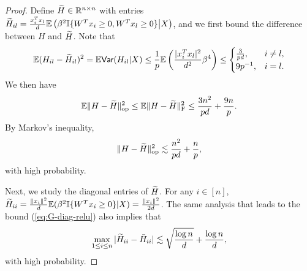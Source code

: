 \begin{proof}
Define $\widetilde{H}\in\mathbb{R}^{n\times n}$ with entries $\widetilde{H}_{il}=\frac{x_i^Tx_l}{d}\mathbb{E}\left(\beta^2\mathbb{I}\{W^Tx_i\geq 0, W^Tx_l\geq 0\}\big|X\right)$, and we first bound the difference between $H$ and $\widetilde{H}$. Note that
$$\mathbb{E}(H_{il}-\wt{H}_{il})^2=\mathbb{E}\Var(H_{il}|X)\leq \frac{1}{p}\mathbb{E}\left(\frac{|x_i^Tx_l|^2}{d^2}\beta^4\right)\leq\begin{cases}
\frac{3}{pd}, & i\neq l, \\
9p^{-1}, & i=l.
\end{cases}$$
We then have
$$\mathbb{E}\|H-\widetilde{H}\|_{\rm op}^2 \leq \mathbb{E}\|H-\widetilde{H}\|_{\rm F}^2 \leq \frac{3n^2}{pd} + \frac{9n}{p}.$$
By Markov's inequality,
\begin{equation}
\opnorm{H-\wt{H}}^2 \lesssim \frac{n^2}{pd} + \frac{n}{p}, \label{eq:H-H-tilde-relu}
\end{equation}
with high probability.

Next, we study the diagonal entries of $\widetilde{H}$. For any $i\in[n]$, $\widetilde{H}_{ii}=\frac{\|x_i\|^2}{d}\mathbb{E}(\beta^2\mathbb{I}\{W^Tx_i\geq 0\}|X)=\frac{\|x_i\|^2}{2d}$. The same analysis that leads to the bound (\ref{eq:G-diag-relu}) also implies that
\begin{equation}
\max_{1\leq i\leq n}|\wt{H}_{ii}-\bar{H}_{ii}|\lesssim \sqrt{\frac{\log n}{d}}+\frac{\log n}{d}, \label{eq:H-diag-relu}
\end{equation}
with high probability.


\end{proof}
